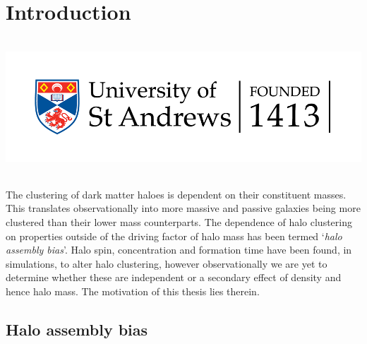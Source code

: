 \chapter{Introduction}
\vspace{-5in}
\includegraphics[height=2.0in]{thesis/latex/st_a_logo_.png}
\vspace{3in}

\label{ch:intro}
The clustering of dark matter haloes is dependent on their constituent masses. This translates observationally into more massive and passive galaxies being more clustered than their lower mass counterparts. The dependence of halo clustering on properties outside of the driving factor of halo mass has been termed `\textit{halo assembly bias}'. Halo spin, concentration and formation time have been found, in simulations, to alter halo clustering, however observationally we are yet to determine whether these are independent or a secondary effect of density and hence halo mass. The motivation of this thesis lies therein. 
\section{Halo assembly bias}